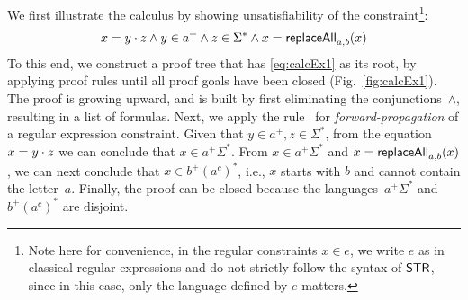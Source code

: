 \begin{example}
  \label{ex:calc1}
  We first illustrate the calculus by showing unsatisfiability of the
  constraint\footnote{Note here for convenience, in the regular constraints $x \in e$, we write $e$ as in classical regular expressions and do not strictly follow the syntax of $\mathsf{STR}$, since in this case, only the language defined by $e$ matters. }:
  \begin{equation}
    \label{eq:calcEx1}
    x = y \cdot z \wedge y \in a^+ \wedge z \in \Sigma^*
    \wedge x = \mathsf{replaceAll}_{a, b}(x)
  \end{equation}
  To this end, we construct a proof tree that has \eqref{eq:calcEx1}
  as its root, by applying proof rules until all proof goals have been
  closed (Fig.~\ref{fig:calcEx1}). The proof is growing upward, and
  is built by first eliminating the conjunctions~$\wedge$, resulting
  in a list of formulas. Next, we apply the rule~ for
  \emph{forward-propagation} of a regular expression constraint. Given
  that $y \in a^+, z \in \Sigma^*$, from the
  equation~$x = y \cdot z$ we can conclude that $x \in
  a^+\Sigma^*$. From $x \in a^+\Sigma^*$ and
  $x = \mathsf{replaceAll}_{a, b}(x)$, we can next conclude that
  $x \in b^+(a^c)^*$, i.e., $x$ starts with $b$ and
  cannot contain the letter~$a$. Finally,
  the proof can be closed because the languages~$a^+\Sigma^*$ and
  $b^+(a^c)^*$ are disjoint.
\end{example}

